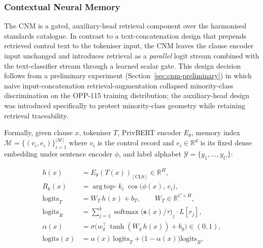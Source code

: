 \documentclass[final,3p,times,twocolumn]{elsarticle}
\begin{document}
	\subsubsection{Contextual Neural Memory}
	\label{sec:cnm} The CNM is a gated, auxiliary-head retrieval component over
	the harmonised standards catalogue. In contrast to a text-concatenation design
	that prepends retrieved control text to the tokeniser input, the CNM leaves
	the clause encoder input unchanged and introduces retrieval as a \emph{parallel}
	logit stream combined with the text-classifier stream through a learned scalar
	gate. This design decision follows from a preliminary experiment (Section~\ref{sec:cnm-preliminary})
	in which naive input-concatenation retrieval-augmentation collapsed minority-class
	discrimination on the OPP-115 training distribution; the auxiliary-head design
	was introduced specifically to protect minority-class geometry while retaining
	retrieval traceability.

	Formally, given clause $x$, tokeniser $T$, PrivBERT encoder $E_{\theta}$, memory
	index $\mathcal{M}= \{(v_{i}, e_{i})\}_{i=1}^{|\mathcal{M}|}$ where $v_{i}$ is
	the control record and $e_{i} \in \mathbb{R}^{d}$ is its fixed dense embedding
	under sentence encoder $\phi$, and label alphabet
	$\mathcal{Y}= \{y_{1}, \ldots, y_{C}\}$:

	\begin{align}
		h(x)              & = E_{\theta}(T(x))_{[\text{CLS}]}\in \mathbb{R}^{H}, \label{eq:cnm-encoder}                                              \\
		R_{k}(x)          & = \operatorname*{arg\,top-}k_{i}\; \cos\!\bigl(\phi(x),\, e_{i}\bigr), \label{eq:cnm-retriever}                          \\
		\text{logits}_{T} & = W_{T}\, h(x) + b_{T}, \qquad W_{T} \in \mathbb{R}^{C \times H}, \label{eq:cnm-text-head}                               \\
		\text{logits}_{R} & = \sum_{j=1}^{k}\operatorname{softmax}\!\bigl(\mathbf{s}(x)/\tau\bigr)_{j} \cdot L[r_{j}], \label{eq:cnm-retrieval-head} \\
		\alpha(x)         & = \sigma\!\bigl(w_{g}^{\top}\, \tanh(W_{g}\, h(x)) + b_{g}\bigr) \in (0,1), \label{eq:cnm-gate}                          \\
		\text{logits}(x)  & = \alpha(x)\, \text{logits}_{T} + \bigl(1 - \alpha(x)\bigr) \text{logits}_{R}, \label{eq:cnm-combined}
	\end{align}
\end{document}
